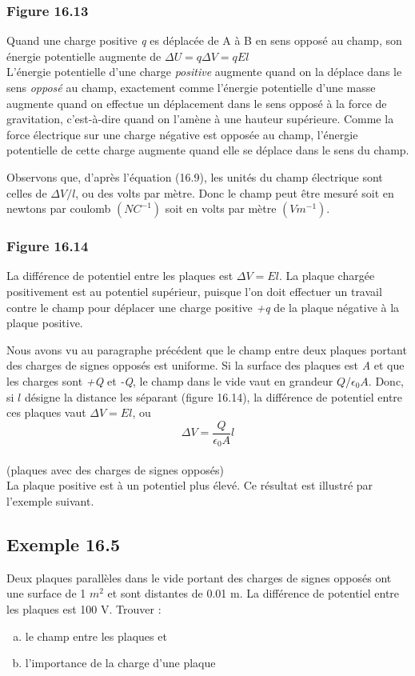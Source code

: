 \documentclass[../main.tex]{subfiles}
\begin{document}
\subsubsection*{Figure 16.13}
Quand une charge positive \textit{q} es déplacée de A à B en sens opposé au champ, son énergie potentielle augmente de $\Delta U = q\Delta V = qEl$\\
L'énergie potentielle d'une charge \textit{positive} augmente quand on la déplace dans le sens \textit{opposé} au champ, exactement comme l'énergie potentielle d'une masse augmente quand on effectue un déplacement dans le sens opposé à la force de gravitation, c'est-à-dire quand on l'amène à une hauteur supérieure. Comme la force électrique sur une charge négative est opposée au champ, l'énergie potentielle de cette charge augmente quand elle se déplace dans le sens du champ.\\
\par Observons que, d'après l'équation (16.9), les unités du champ électrique sont celles de $\Delta V/l$, ou des volts par mètre. Donc le champ peut être mesuré soit en newtons par coulomb $(NC^{-1})$ soit en volts par mètre $(Vm^{-1})$.\\
\subsubsection*{Figure 16.14}
La différence de potentiel entre les plaques est $\Delta V = El$. La plaque chargée positivement est au potentiel supérieur, puisque l'on doit effectuer un travail contre le champ pour déplacer une charge positive \textit{+q} de la plaque négative à la plaque positive.\\
\par Nous avons vu au paragraphe précédent que le champ entre deux plaques portant des charges de signes opposés est uniforme. Si la surface des plaques est \textit{A} et que les charges sont \textit{+Q} et \textit{-Q}, le champ dans le vide vaut en grandeur $Q/\epsilon_0A$. Donc, si $l$ désigne la distance les séparant (figure 16.14), la différence de potentiel entre ces plaques vaut $\Delta V = El$, ou\\
$$\Delta V = \frac{Q}{\epsilon_0A}l$$\\
(plaques avec des charges de signes opposés)\\

La plaque positive est à un potentiel plus élevé. Ce résultat est illustré par l'exemple suivant.\\
\subsection{Exemple 16.5}
Deux plaques parallèles dans le vide portant des charges de signes opposés ont une surface de 1 $m^2$ et sont distantes de 0.01 m. La différence de potentiel entre les plaques est 100 V. Trouver :\\
\begin{enumerate}[a)]
    \item le champ entre les plaques et 
    \item l'importance de la charge d'une plaque 
\end{enumerate}
\end{document}
